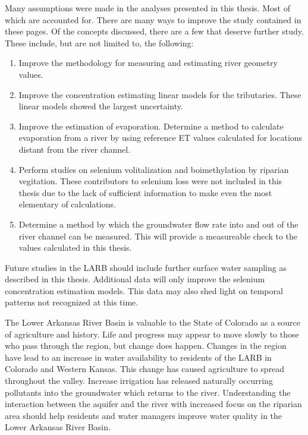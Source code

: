 Many assumptions were made in the analyses presented in this thesis.  Most of which are accounted for.  There are many ways to improve the study contained in these pages.  Of the concepts discussed, there are a few that deserve further study.  These include, but are not limited to, the following:
\begin{enumerate}
	\item Improve the methodology for measuring and estimating river geometry values.
	\item Improve the concentration estimating linear models for the tributaries.  These linear models showed the largest uncertainty.
	\item Improve the estimation of evaporation.  Determine a method to calculate evaporation from a river by using reference ET values calculated for locations distant from the river channel.
	\item Perform studies on selenium volitalization and boimethylation by riparian vegitation.  These contributors to selenium loss were not included in this thesis due to the lack of sufficient information to make even the most elementary of calculations.
	\item Determine a method by which the groundwater flow rate into and out of the river channel can be measured.  This will provide a measureable check to the values calculated in this thesis.
\end{enumerate}

Future studies in the LARB should include further surface water sampling as described in this thesis.  Additional data will only improve the selenium concentration estimation models.  This data may also shed light on temporal patterns not recognized at this time.

The Lower Arkansas River Basin is valuable to the State of Colorado as a source of agriculture and history.  Life and progress may appear to move slowly to those who pass through the region, but change does happen.  Changes in the region have lead to an increase in water availability to residents of the LARB in Colorado and Western Kansas.  This change has caused agriculture to spread throughout the valley.  Increase irrigation has released naturally occurring pollutants into the groundwater which returns to the river.  Understanding the interaction between the aquifer and the river with increased focus on the riparian area should help residents and water managers improve water quality in the Lower Arkansas River Basin.

\clearpage{}